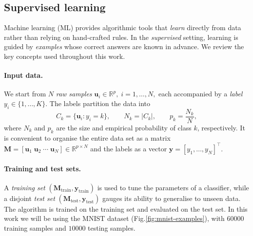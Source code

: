 \documentclass[twocolumn]{article} %
\begin{document}
\subsection{Supervised learning}
\label{subsec:ml}

Machine learning (ML) provides algorithmic tools that \emph{learn}
directly from data rather than relying on hand-crafted rules.
In the \emph{supervised} setting, learning is guided by \emph{examples}
whose correct answers are known in advance.  We review the key
concepts used throughout this work.

\paragraph{Input data.}
We start from $N$ \emph{raw samples}
\(
\mathbf u_i\in\mathbb R^{p},\; i=1,\dots,N,
\)
each accompanied by a \emph{label}
\(
y_i\in\{1,\dots,K\}.
\)
The labels partition the data into
\[
C_k=\{\mathbf u_i: y_i=k\},
\qquad
N_k=|C_k|,
\qquad
p_k=\frac{N_k}{N},
\]
where $N_k$ and $p_k$ are the size and empirical probability of class
$k$, respectively.  It is convenient to organise the entire data set as
a matrix
$
\mathbf M=[\mathbf u_1\;\mathbf u_2\;\cdots\;\mathbf u_N]\in\mathbb R^{p\times N}
$
and the labels as a vector
$
\mathbf y=[y_1,\dots,y_N]^{\!\top}\!.
$

\paragraph{Training and test sets.}
A \emph{training set}
$(\mathbf M_{\text{train}},\mathbf y_{\text{train}})$
is used to tune the parameters of a classifier, while a disjoint
\emph{test set}
$(\mathbf M_{\text{test}},\mathbf y_{\text{test}})$
gauges its ability to generalise to unseen data. 
The algorithm is trained on the training set and evaluated on the test set. In this work we will be using the MNIST dataset (Fig.\ref{fig:mnist-examples}), with $60000$ training samples and $10000$ testing samples.
\end{document}
